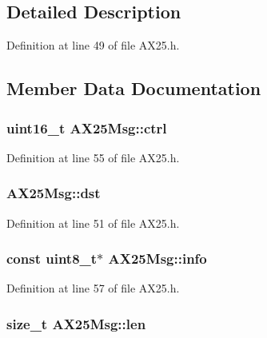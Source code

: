 \subsection{Detailed Description}


Definition at line 49 of file A\+X25.\+h.



\subsection{Member Data Documentation}
\subsubsection[{\texorpdfstring{ctrl}{ctrl}}]{\setlength{\rightskip}{0pt plus 5cm}uint16\+\_\+t A\+X25\+Msg\+::ctrl}\hypertarget{struct_a_x25_msg_a375105fdcb83cb525082d8dbc22c2d33}{}\label{struct_a_x25_msg_a375105fdcb83cb525082d8dbc22c2d33}


Definition at line 55 of file A\+X25.\+h.

\subsubsection[{\texorpdfstring{dst}{dst}}]{ A\+X25\+Msg\+::dst}\hypertarget{struct_a_x25_msg_a38dc18966290b4f8cb24651e9e75ef66}{}\label{struct_a_x25_msg_a38dc18966290b4f8cb24651e9e75ef66}


Definition at line 51 of file A\+X25.\+h.

\subsubsection[{\texorpdfstring{info}{info}}]{\setlength{\rightskip}{0pt plus 5cm}const uint8\+\_\+t$\ast$ A\+X25\+Msg\+::info}\hypertarget{struct_a_x25_msg_ac2aec986679b69baa42af40caf9a48bd}{}\label{struct_a_x25_msg_ac2aec986679b69baa42af40caf9a48bd}


Definition at line 57 of file A\+X25.\+h.

\subsubsection[{\texorpdfstring{len}{len}}]{\setlength{\rightskip}{0pt plus 5cm}size\+\_\+t A\+X25\+Msg\+::len}\hypertarget{struct_a_x25_msg_a45b0f4c6c77aec02cd647b51e0f736e1}{}\label{struct_a_x25_msg_a45b0f4c6c77aec02cd647b51e0f736e1}


